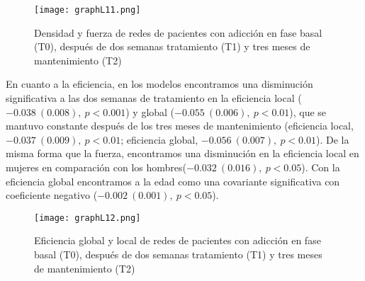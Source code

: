 \begin{figure}[!htb]
    \centering
    \texttt{[image: graphL11.png]}
    \caption{Densidad y fuerza de redes de pacientes con adicción en fase basal (T0), después de dos semanas tratamiento (T1) y tres meses de mantenimiento (T2)}
    \label{fig:gpL11}
\end{figure}

En cuanto a la eficiencia, en los modelos encontramos una disminución significativa a las dos semanas de tratamiento en la eficiencia local ($-0.038\ (0.008),\ p<0.001$) y global ($-0.055\ (0.006),\ p<0.01$), que se mantuvo constante después de los tres meses de mantenimiento (eficiencia local, $-0.037\ (0.009),\ p<0.01$; eficiencia global, $-0.056\ (0.007),\ p<0.01$). De la misma forma que la fuerza, encontramos una disminución en la eficiencia local en mujeres en comparación con los hombres($-0.032\ (0.016),\ p<0.05$). Con la eficiencia global encontramos a la edad como una covariante significativa con coeficiente negativo ($-0.002\ (0.001),\ p<0.05$).

\begin{figure}[!htb]
    \centering
    \texttt{[image: graphL12.png]}
    \caption{Eficiencia global y local de redes de pacientes con adicción en fase basal (T0), después de dos semanas tratamiento (T1) y tres meses de mantenimiento (T2)}
    \label{fig:gpL12}
\end{figure}


